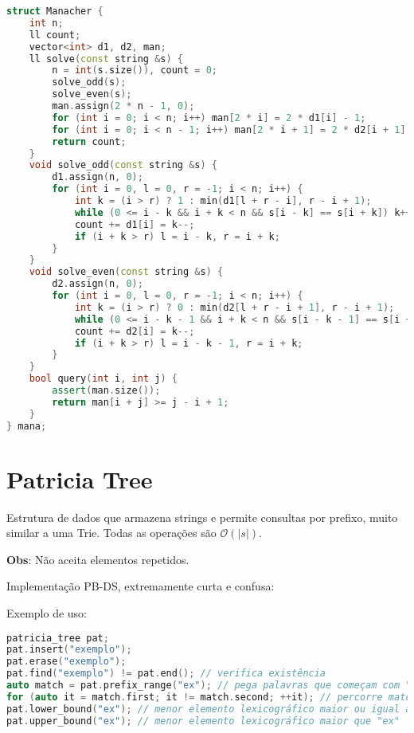 \documentclass[10pt, a4paper, oneside]{book}
\begin{document}
\begin{lstlisting}[language=C++]
struct Manacher {
    int n;
    ll count;
    vector<int> d1, d2, man;
    ll solve(const string &s) {
        n = int(s.size()), count = 0;
        solve_odd(s);
        solve_even(s);
        man.assign(2 * n - 1, 0);
        for (int i = 0; i < n; i++) man[2 * i] = 2 * d1[i] - 1;
        for (int i = 0; i < n - 1; i++) man[2 * i + 1] = 2 * d2[i + 1];
        return count;
    }
    void solve_odd(const string &s) {
        d1.assign(n, 0);
        for (int i = 0, l = 0, r = -1; i < n; i++) {
            int k = (i > r) ? 1 : min(d1[l + r - i], r - i + 1);
            while (0 <= i - k && i + k < n && s[i - k] == s[i + k]) k++;
            count += d1[i] = k--;
            if (i + k > r) l = i - k, r = i + k;
        }
    }
    void solve_even(const string &s) {
        d2.assign(n, 0);
        for (int i = 0, l = 0, r = -1; i < n; i++) {
            int k = (i > r) ? 0 : min(d2[l + r - i + 1], r - i + 1);
            while (0 <= i - k - 1 && i + k < n && s[i - k - 1] == s[i + k]) k++;
            count += d2[i] = k--;
            if (i + k > r) l = i - k - 1, r = i + k;
        }
    }
    bool query(int i, int j) {
        assert(man.size());
        return man[i + j] >= j - i + 1;
    }
} mana;\end{lstlisting}
\hfill

\section{Patricia Tree}


Estrutura de dados que armazena strings e permite consultas por prefixo, muito similar a uma Trie. Todas as operações são $\mathcal{O}(|s|)$.



\textbf{Obs}: Não aceita elementos repetidos.



Implementação PB-DS, extremamente curta e confusa:



Exemplo de uso:



\begin{lstlisting}[language=C++]
patricia_tree pat;
pat.insert("exemplo");
pat.erase("exemplo");
pat.find("exemplo") != pat.end(); // verifica existência
auto match = pat.prefix_range("ex"); // pega palavras que começam com "ex"
for (auto it = match.first; it != match.second; ++it); // percorre match
pat.lower_bound("ex"); // menor elemento lexicográfico maior ou igual a "ex"
pat.upper_bound("ex"); // menor elemento lexicográfico maior que "ex"
\end{lstlisting}
\end{document}
